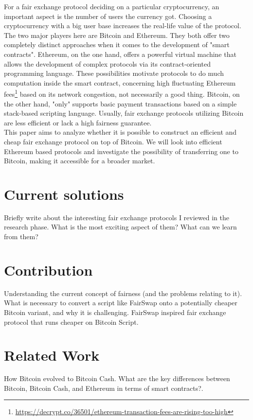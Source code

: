 \documentclass{cacthesis}
\newcounter{protocol}
\begin{document}
        For a fair exchange protocol deciding on a particular cryptocurrency, an important aspect is the number of users the currency got. Choosing a cryptocurrency with a big user base increases the real-life value of the protocol. The two major players here are Bitcoin and Ethereum. They both offer two completely distinct approaches when it comes to the development of "smart contracts". Ethereum, on the one hand, offers a powerful virtual machine that allows the development of complex protocols via its contract-oriented programming language. These possibilities motivate protocols to do much computation inside the smart contract, concerning high fluctuating Ethereum fees\footnote{\url{https://decrypt.co/36501/ethereum-transaction-fees-are-rising-too-high}} based on its network congestion, not necessarily a good thing. Bitcoin, on the other hand, "only" supports basic payment transactions based on a simple stack-based scripting language. Usually, fair exchange protocols utilizing Bitcoin are less efficient or lack a high fairness guarantee. \\
        This paper aims to analyze whether it is possible to construct an efficient and cheap fair exchange protocol on top of Bitcoin. We will look into efficient Ethereum based protocols and investigate the possibility of transferring one to Bitcoin, making it accessible for a broader market.
        
        \section{Current solutions}
        Briefly write about the interesting fair exchange protocols I reviewed in the research phase. What is the most exciting aspect of them? What can we learn from them?
        
        
        
        \section{Contribution}
        Understanding the current concept of fairness (and the problems relating to it). \\
        What is necessary to convert a script like FairSwap onto a potentially cheaper Bitcoin variant, and why it is challenging.
        FairSwap inspired fair exchange protocol that runs cheaper on Bitcoin Script.

        \section{Related Work}
        How Bitcoin evolved to Bitcoin Cash. What are the key differences between Bitcoin, Bitcoin Cash, and Ethereum in terms of smart contracts?.
    
\end{document}
